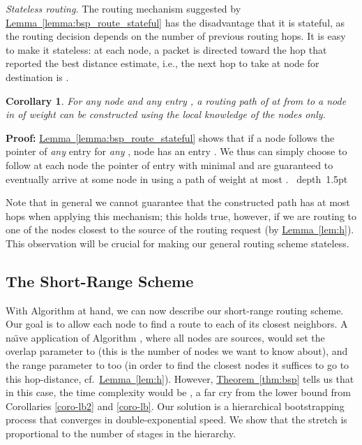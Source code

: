 \documentclass[letterpaper,11pt]{article}
\newcommand{\namedref}[2]{\hyperref[#2]{#1~\ref*{#2}}}
\newcommand{\theoremref}[1]{\namedref{Theorem}{#1}}
\newcommand{\lemmaref}[1]{\namedref{Lemma}{#1}}
\newtheorem{corollary}[theorem]{Corollary}
\newcommand{\blackslug}{\hbox{\hskip 1pt \vrule width 4pt height 8pt
depth 1.5pt \hskip 1pt}}
\newcommand{\QED}{\quad\blackslug\lower 8.5pt\null\par}
\newenvironment{proof}[1][Proof:]{\noindent \textbf{#1}\xspace}{\QED}
\begin{document}
\emph{Stateless routing.} 
The routing mechanism suggested by \lemmaref{lemma:bsp_route_stateful} has the
disadvantage that it is stateful, as the routing decision depends on the number
of previous routing hops. It is easy to make it stateless: at each
node, a packet is directed toward the hop that reported the best
distance estimate, i.e., the next hop to take at node  for
destination  is .
\begin{corollary}\label{coro:bsp_route_stateless}
For any node  and any entry , a routing path of at
from  to a node in  of weight  can be constructed using the local
knowledge of the nodes only.
\end{corollary}
\begin{proof}
\lemmaref{lemma:bsp_route_stateful} shows that if a node  follows the
 pointer of \emph{any} entry  for \emph{any}
, node  has an entry
. We thus can simply choose to
follow at each node  the  pointer of entry  with minimal  and are guaranteed to
eventually arrive at some node in  using a path of weight at most .
\end{proof}
Note that in general we cannot guarantee that the constructed path has at most
 hops when applying this mechanism; this holds true, however,  if we
are routing to one of the  nodes closest to the source of the
routing request (by \lemmaref{lem:h}). This observation will be crucial for
making our general routing scheme stateless.

\subsection{The Short-Range Scheme}
\label{sec:short}

With Algorithm  at hand, we can now describe our short-range routing
scheme. Our goal is to allow each node to find a route to each of its closest
 neighbors. A na\"\i ve application of Algorithm ,
where all nodes are sources, would set the overlap parameter to
 (this is the number of nodes we want to know about),
and the range parameter to  too (in order to find the
closest  nodes it suffices to go to this hop-distance,
cf.\ \lemmaref{lem:h}). However, \theoremref{thm:bsp} tells us that in this
case, the time complexity would be , a far cry
from the  lower bound from Corollaries \ref{coro-lb2} and
\ref{coro-lb}. Our solution is a hierarchical bootstrapping process that
converges in double-exponential speed. We show that the stretch is proportional
to the number of stages in the hierarchy.
\end{document}
